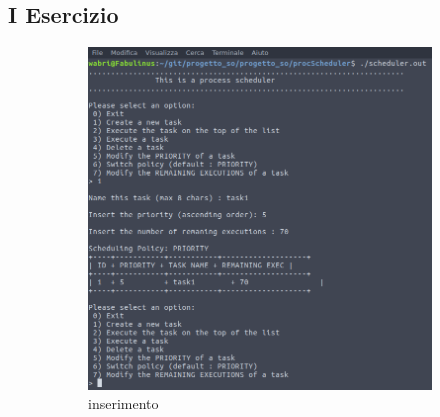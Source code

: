 \subsection{I Esercizio}
\begin{figure}[!h]
\centering
\begin{subfigure}[b]{0.4\textwidth}
\includegraphics[width=\textwidth]{progetto_so/procScheduler/screenshot/1_new_task_without_error}
\caption{inserimento}
\end{subfigure}
\begin{subfigure}[b]{0.4\textwidth}

\end{subfigure}
\end{figure}

